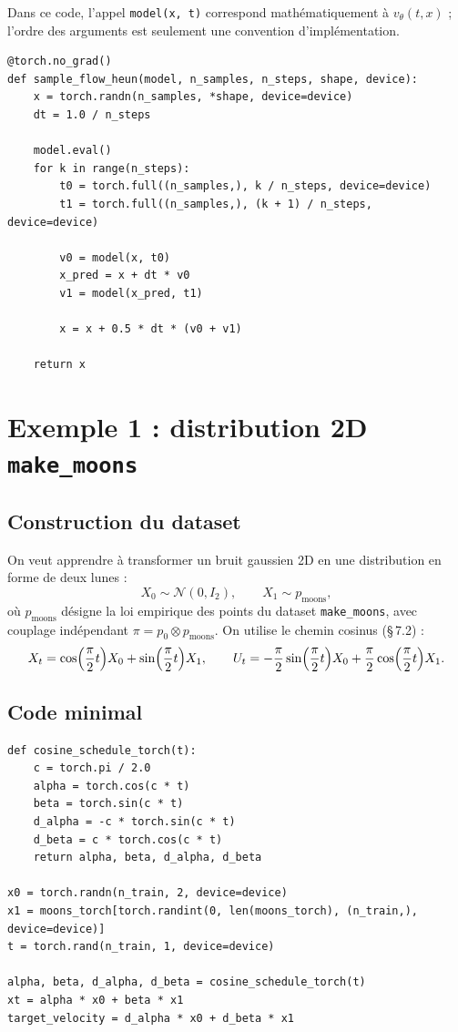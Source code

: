 \documentclass[11pt,a4paper]{article}
\theoremstyle{definition}
\theoremstyle{plain}
\theoremstyle{remark}
\begin{document}
Dans ce code, l'appel \texttt{model(x, t)} correspond mathématiquement à
$v_\theta(t,x)$ ; l'ordre des arguments est seulement une convention
d'implémentation.

\begin{lstlisting}[style=pythoncourse,caption={Schéma de Heun (ordre 2)}]
@torch.no_grad()
def sample_flow_heun(model, n_samples, n_steps, shape, device):
    x = torch.randn(n_samples, *shape, device=device)
    dt = 1.0 / n_steps

    model.eval()
    for k in range(n_steps):
        t0 = torch.full((n_samples,), k / n_steps, device=device)
        t1 = torch.full((n_samples,), (k + 1) / n_steps, device=device)

        v0 = model(x, t0)
        x_pred = x + dt * v0
        v1 = model(x_pred, t1)

        x = x + 0.5 * dt * (v0 + v1)

    return x
\end{lstlisting}

\section{Exemple 1 : distribution 2D \texttt{make\_moons}}

\subsection{Construction du dataset}

On veut apprendre à transformer un bruit gaussien 2D en une distribution en
forme de deux lunes :
\[
  X_0 \sim \mathcal{N}(0,I_2),
  \qquad
  X_1 \sim p_{\mathrm{moons}},
\]
où $p_{\mathrm{moons}}$ désigne la loi empirique des points du dataset
\texttt{make\_moons}, avec couplage indépendant $\pi=p_0\otimes p_{\mathrm{moons}}$.
On utilise le chemin cosinus (\S\,7.2) :
\[
  X_t = \cos\Bigl(\frac{\pi}{2}t\Bigr)X_0 + \sin\Bigl(\frac{\pi}{2}t\Bigr)X_1,
  \qquad
  U_t = -\frac{\pi}{2}\sin\Bigl(\frac{\pi}{2}t\Bigr)X_0 + \frac{\pi}{2}\cos\Bigl(\frac{\pi}{2}t\Bigr)X_1.
\]

\subsection{Code minimal}

\begin{lstlisting}[style=pythoncourse,caption={Interpolation cosinus et cible de vitesse}]
def cosine_schedule_torch(t):
    c = torch.pi / 2.0
    alpha = torch.cos(c * t)
    beta = torch.sin(c * t)
    d_alpha = -c * torch.sin(c * t)
    d_beta = c * torch.cos(c * t)
    return alpha, beta, d_alpha, d_beta

x0 = torch.randn(n_train, 2, device=device)
x1 = moons_torch[torch.randint(0, len(moons_torch), (n_train,), device=device)]
t = torch.rand(n_train, 1, device=device)

alpha, beta, d_alpha, d_beta = cosine_schedule_torch(t)
xt = alpha * x0 + beta * x1
target_velocity = d_alpha * x0 + d_beta * x1
\end{lstlisting}
\end{document}
